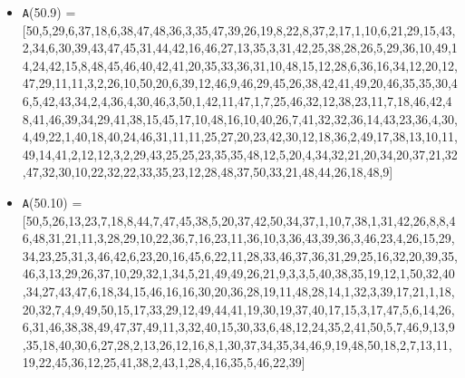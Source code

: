 \documentclass[runningheads,a4paper]{llncs}
\begin{document}
\begin{itemize}
	\item {\texttt A(50.9) = } [50,5,29,6,37,18,6,38,47,48,36,3,35,47,39,26,19,8,22,8,37,2,17,1,10,6,21,29,15,43,2,34,6,30,39,43,47,45,31,44,42,16,46,27,13,35,3,31,42,25,38,28,26,5,29,36,10,49,14,24,42,15,8,48,45,46,40,42,41,20,35,33,36,31,10,48,15,12,28,6,36,16,34,12,20,12,47,29,11,11,3,2,26,10,50,20,6,39,12,46,9,46,29,45,26,38,42,41,49,20,46,35,35,30,46,5,42,43,34,2,4,36,4,30,46,3,50,1,42,11,47,1,7,25,46,32,12,38,23,11,7,18,46,42,48,41,46,39,34,29,41,38,15,45,17,10,48,16,10,40,26,7,41,32,32,36,14,43,23,36,4,30,4,49,22,1,40,18,40,24,46,31,11,11,25,27,20,23,42,30,12,18,36,2,49,17,38,13,10,11,49,14,41,2,12,12,3,2,29,43,25,25,23,35,35,48,12,5,20,4,34,32,21,20,34,20,37,21,32,47,32,30,10,22,32,22,33,35,23,12,28,48,37,50,33,21,48,44,26,18,48,9]
	\item {\texttt A(50.10) = } [50,5,26,13,23,7,18,8,44,7,47,45,38,5,20,37,42,50,34,37,1,10,7,38,1,31,42,26,8,8,46,48,31,21,11,3,28,29,10,22,36,7,16,23,11,36,10,3,36,43,39,36,3,46,23,4,26,15,29,34,23,25,31,3,46,42,6,23,20,16,45,6,22,11,28,33,46,37,36,31,29,25,16,32,20,39,35,46,3,13,29,26,37,10,29,32,1,34,5,21,49,49,26,21,9,3,3,5,40,38,35,19,12,1,50,32,40,34,27,43,47,6,18,34,15,46,16,16,30,20,36,28,19,11,48,28,14,1,32,3,39,17,21,1,18,20,32,7,4,9,49,50,15,17,33,29,12,49,44,41,19,30,19,37,40,17,15,3,17,47,5,6,14,26,6,31,46,38,38,49,47,37,49,11,3,32,40,15,30,33,6,48,12,24,35,2,41,50,5,7,46,9,13,9,35,18,40,30,6,27,28,2,13,26,12,16,8,1,30,37,34,35,34,46,9,19,48,50,18,2,7,13,11,19,22,45,36,12,25,41,38,2,43,1,28,4,16,35,5,46,22,39]
\end{itemize}
\end{document}
